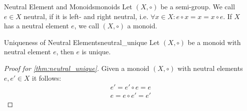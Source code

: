 \begin{definition}{Neutral Element and Monoids}{monoids}
    Let $(X,\circ)$ be a semi-group. We call $e\in X$ neutral, if it is left- and right neutral, i.e.
    $\forall x\in X\colon e\circ x = x = x\circ e$. If $X$ has a neutral element $e$, we call 
    $(X,\circ)$ a monoid.
\end{definition}

\begin{theorem}{Uniqueness of Neutral Elements}{neutral_unique}
    Let $(X,\circ)$ be a monoid with neutral element $e$, then $e$ is unique.
\end{theorem}
\begin{proof}[Proof for \autoref{thm:neutral_unique}]
    Given a monoid $(X,\circ)$ with neutral elements $e,e'\in X$ it follows:
    \begin{align*}
        &e' = e'\circ e = e\\
        &e = e\circ e' = e'
    \end{align*}
\end{proof}